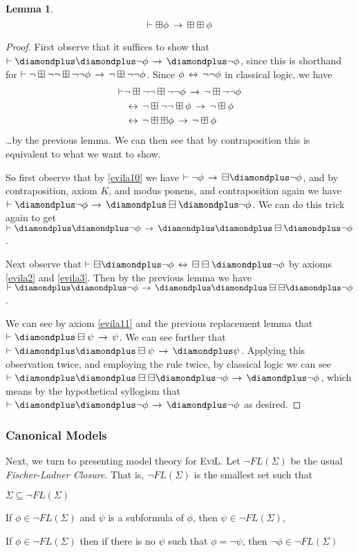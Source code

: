 \documentclass[11pt]{article}
\newtheorem{lemma}[theorem]{Lemma}
\newcommand{\DDI}{\diamondplus}
\newcommand{\BB}{\boxminus}
\newcommand{\BBI}{\boxplus}
\begin{document}
\begin{lemma}
\[ \vdash \BBI \phi \IMPL \BBI\BBI\phi \]
\end{lemma}
\begin{proof}
	\item First observe that it suffices to show that $\vdash\DDI\DDI\neg\phi \IMPL \DDI\neg\phi$, since this is shorthand for $\vdash\neg\BBI\neg\neg\BBI\neg\neg\phi \IMPL \neg\BBI\neg\neg\phi$.  Since $\phi \,\leftrightarrow\, \neg\neg\phi$ in classical logic, we have
	\begin{align*} \vdash & \neg\BBI\neg\neg\BBI\neg\neg\phi \IMPL \neg\BBI\neg\neg\phi \\
			& \IFF \neg\BBI\neg\neg\BBI\phi \IMPL \neg\BBI\phi\\
			& \IFF \neg\BBI\BBI\phi \IMPL \neg\BBI\phi \end{align*}
			\ldots by the previous lemma.  We can then see that by contraposition this is equivalent to what we want to show.
			
	So first observe that by \ref{evila10} we have $\vdash \neg \phi \IMPL \BB\DDI \neg \phi$, and by contraposition, axiom $K$, and modus ponens, and contraposition again we have $\vdash \DDI \neg \phi \IMPL \DDI\BB\DDI \neg \phi$.  We can do this trick again to get $\vdash \DDI \DDI \neg \phi \IMPL \DDI \DDI\BB\DDI \neg \phi$.
	
	Next observe that $\vdash \BB\DDI\neg \phi \IFF \BB \BB\DDI\neg \phi$ by axioms \ref{evila2} and \ref{evila3}.  Then by the previous lemma we have $\vdash \DDI \DDI \neg \phi \IMPL \DDI \DDI\BB\BB\DDI \neg \phi$.
	
	We can see by axiom \ref{evila11} and the previous replacement lemma that $\vdash \DDI \BB \psi \IMPL \psi$.  We can see further that $\vdash \DDI \DDI \BB \psi \IMPL \DDI \psi$.  Applying this observation twice, and employing the rule twice, by classical logic we can see $\vdash \DDI \DDI\BB\BB\DDI \neg \phi \IMPL \DDI\neg \phi$, which means by the hypothetical syllogism that $\vdash \DDI \DDI \neg \phi \IMPL \DDI\neg\phi$ as desired.
\end{proof}

\subsubsection{Canonical Models}

Next, we turn to presenting model theory for \textsc{EviL}.  Let $\neg FL(\Sigma)$ be the usual \emph{Fischer-Ladner Closure}.  That is, $\neg FL(\Sigma)$ is the smallest set such that
\begin{myroman}
\item  $\Sigma \subseteq \neg FL(\Sigma)$
\item If $\phi \in \neg FL(\Sigma)$ and $\psi$ is a subformula of $\phi$, then $\psi \in \neg FL(\Sigma)$, \item If $\phi \in \neg FL(\Sigma)$ then if there is no $\psi$ such that $\phi = \neg \psi$, then $\neg \phi \in \neg FL(\Sigma)$
\end{myroman}
\end{document}
